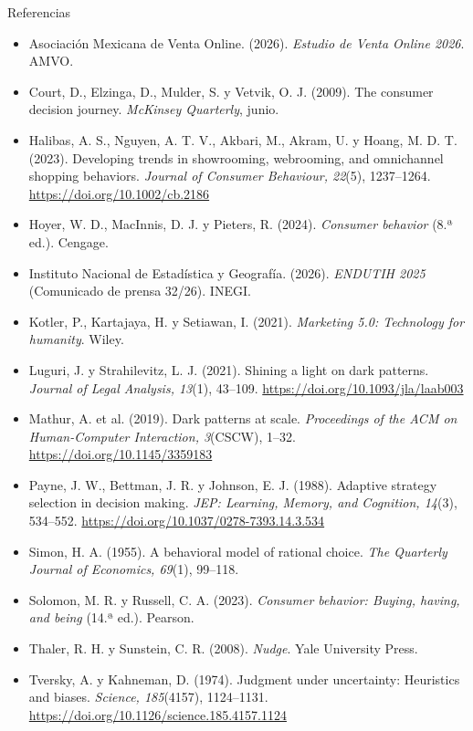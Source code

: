\documentclass[aspectratio=169,xcolor=dvipsnames]{beamer}
\begin{document}
\begin{frame}{Referencias}
\tiny
\begin{itemize}
  \item[] Asociación Mexicana de Venta Online. (2026). \textit{Estudio de Venta Online 2026}. AMVO.
  \item[] Court, D., Elzinga, D., Mulder, S. y Vetvik, O. J. (2009). The consumer decision journey. \textit{McKinsey Quarterly}, junio.
  \item[] Halibas, A. S., Nguyen, A. T. V., Akbari, M., Akram, U. y Hoang, M. D. T. (2023). Developing trends in showrooming, webrooming, and omnichannel shopping behaviors. \textit{Journal of Consumer Behaviour, 22}(5), 1237--1264. \url{https://doi.org/10.1002/cb.2186}
  \item[] Hoyer, W. D., MacInnis, D. J. y Pieters, R. (2024). \textit{Consumer behavior} (8.ª ed.). Cengage.
  \item[] Instituto Nacional de Estadística y Geografía. (2026). \textit{ENDUTIH 2025} (Comunicado de prensa 32/26). INEGI.
  \item[] Kotler, P., Kartajaya, H. y Setiawan, I. (2021). \textit{Marketing 5.0: Technology for humanity}. Wiley.
  \item[] Luguri, J. y Strahilevitz, L. J. (2021). Shining a light on dark patterns. \textit{Journal of Legal Analysis, 13}(1), 43--109. \url{https://doi.org/10.1093/jla/laab003}
  \item[] Mathur, A. et al. (2019). Dark patterns at scale. \textit{Proceedings of the ACM on Human-Computer Interaction, 3}(CSCW), 1--32. \url{https://doi.org/10.1145/3359183}
  \item[] Payne, J. W., Bettman, J. R. y Johnson, E. J. (1988). Adaptive strategy selection in decision making. \textit{JEP: Learning, Memory, and Cognition, 14}(3), 534--552. \url{https://doi.org/10.1037/0278-7393.14.3.534}
  \item[] Simon, H. A. (1955). A behavioral model of rational choice. \textit{The Quarterly Journal of Economics, 69}(1), 99--118.
  \item[] Solomon, M. R. y Russell, C. A. (2023). \textit{Consumer behavior: Buying, having, and being} (14.ª ed.). Pearson.
  \item[] Thaler, R. H. y Sunstein, C. R. (2008). \textit{Nudge}. Yale University Press.
  \item[] Tversky, A. y Kahneman, D. (1974). Judgment under uncertainty: Heuristics and biases. \textit{Science, 185}(4157), 1124--1131. \url{https://doi.org/10.1126/science.185.4157.1124}
\end{itemize}
\end{frame}
\end{document}
